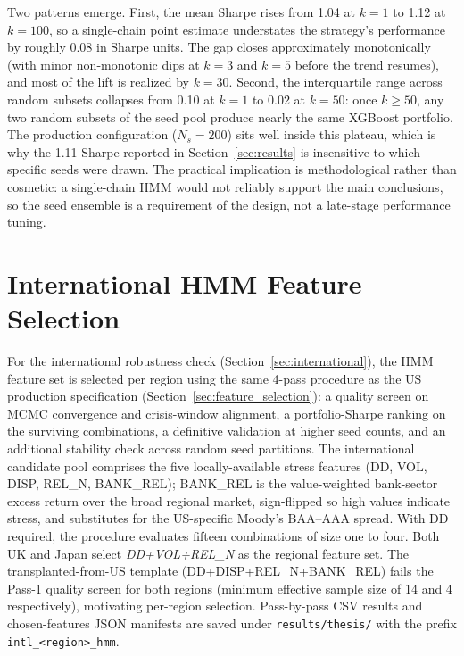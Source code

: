 

Two patterns emerge. First, the mean Sharpe rises from 1.04 at $k = 1$ to 1.12 at $k = 100$, so a single-chain point estimate understates the strategy's performance by roughly 0.08 in Sharpe units. The gap closes approximately monotonically (with minor non-monotonic dips at $k = 3$ and $k = 5$ before the trend resumes), and most of the lift is realized by $k = 30$. Second, the interquartile range across random subsets collapses from 0.10 at $k = 1$ to 0.02 at $k = 50$: once $k \geq 50$, any two random subsets of the seed pool produce nearly the same XGBoost portfolio. The production configuration ($N_s = 200$) sits well inside this plateau, which is why the 1.11 Sharpe reported in Section~\ref{sec:results} is insensitive to which specific seeds were drawn. The practical implication is methodological rather than cosmetic: a single-chain HMM would not reliably support the main conclusions, so the seed ensemble is a requirement of the design, not a late-stage performance tuning.

\section{International HMM Feature Selection}\label{app:intl_feature_selection}

\sloppy
For the international robustness check (Section~\ref{sec:international}), the HMM feature set is selected per region using the same 4-pass procedure as the US production specification (Section~\ref{sec:feature_selection}): a quality screen on MCMC convergence and crisis-window alignment, a portfolio-Sharpe ranking on the surviving combinations, a definitive validation at higher seed counts, and an additional stability check across random seed partitions. The international candidate pool comprises the five locally-available stress features (DD, VOL, DISP, REL\_N, BANK\_REL); BANK\_REL is the value-weighted bank-sector excess return over the broad regional market, sign-flipped so high values indicate stress, and substitutes for the US-specific Moody's BAA--AAA spread. With DD required, the procedure evaluates fifteen combinations of size one to four. Both UK and Japan select \emph{DD+VOL+REL\_N} as the regional feature set. The transplanted-from-US template (DD+DISP+REL\_N+BANK\_REL) fails the Pass-1 quality screen for both regions (minimum effective sample size of 14 and 4 respectively), motivating per-region selection. Pass-by-pass CSV results and chosen-features JSON manifests are saved under \texttt{results/thesis/} with the prefix \texttt{intl\_<region>\_hmm}.

